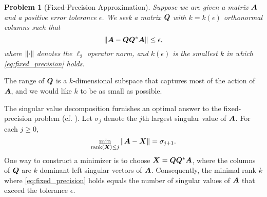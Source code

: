 \documentclass[12pt]{article}
\newtheorem{defn}{Problem}
\newtheorem{subdefn}{Problem}[defn]
\begin{document}
\begin{defn}[Fixed-Precision Approximation]
Suppose we are given a matrix $\bm{A}$ and a positive error tolerance $\epsilon$. We seek a matrix $\bm{Q}$ with $k = k(\epsilon)$ orthonormal columns
such that
\begin{equation} \label{eq:fixed_precision}
\left\Vert { \bm{A} - \bm{QQ}^*\bm{A} } \right\Vert \leq \epsilon,
\end{equation}
where $\left\Vert { \cdot } \right\Vert$ denotes the $\ell_2$ operator norm, and $k(\epsilon)$ is the smallest $k$ in which \eqref{eq:fixed_precision} holds.
\end{defn}

The range of $\bm{Q}$ is a $k$-dimensional subspace that captures most of the action of $\bm{A}$, and we would like $k$ to be as small as possible. 



The singular value decomposition furnishes an optimal answer to
the fixed-precision problem (cf. \cite{Mir60:Symmetric-Gauge}).
Let $\sigma_{j}$ denote the $j$th largest singular value of $\bm{A}$.
For each $j \geq 0$,
\begin{equation}
\label{eqn:mirsky}
\min_{{\rm rank}(\bm{X}) \leq j}\left\Vert { \bm{A} - \bm{X} } \right\Vert = \sigma_{j+1}.
\end{equation}
One way to construct a minimizer is to choose $\bm{X} = \bm{QQ}^*\bm{A}$,
where the columns of $\bm{Q}$ are $k$ dominant left singular vectors of $\bm{A}$.
Consequently, the minimal rank $k$ where \eqref{eq:fixed_precision} holds
equals the number of singular values of $\bm{A}$ that exceed the tolerance $\epsilon$.
\end{document}
